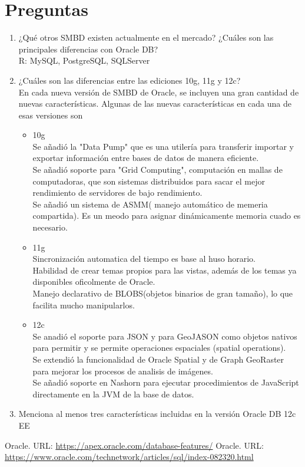 \documentclass[10pt]{article}
\begin{document}
	\section{Preguntas}
	\begin{enumerate}
		\item ¿Qué otros SMBD existen actualmente en el mercado? ¿Cuáles son las principales diferencias con Oracle DB?\\
		R: MySQL, PostgreSQL, SQLServer
        \item ¿Cuáles son las diferencias entre las ediciones 10g, 11g y 12c?\\
		En cada nueva versión de SMBD de Oracle, se incluyen una gran cantidad
		de nuevas características. Algunas de las nuevas características en 
		cada una de esas versiones son 
		\begin{itemize}
			\item {
				10g \\
				Se añadió la "Data Pump" que es una utilería para transferir
				importar y exportar información entre bases de datos de manera 
				eficiente. \\
				Se añadió soporte para "Grid Computing", computación en mallas
				de computadoras, que son sistemas distribuidos para sacar el 
				mejor rendimiento de servidores de bajo rendimiento. \\
				Se añadió un sistema de ASMM( manejo automático de memeria 
				compartida). Es un meodo para asignar dinámicamente memoria
				cuado es necesario.

			}
			\item {
				11g \\
				Sincronización automatica del tiempo es base al huso horario. \\
				Habilidad de crear temas propios para las vistas, además de los 
				temas ya disponibles oficolmente de Oracle. \\
				Manejo declarativo de BLOBS(objetos binarios de gran tamaño), lo que
				facilita mucho manipularlos.
			}
			\item {
				12c \\
				Se anadió el soporte para JSON  y para GeoJASON como objetos 
				nativos para permitir y se permite operaciones espaciales 
				(spatial operations).\\
				Se extendió la funcionalidad de Oracle Spatial y de Graph 
				GeoRaster para mejorar los procesos de analisis de imágenes. \\
				Se añadió soporte en Nashorn para ejecutar procedimientos de 
				JavaScript directamente en la JVM de la base de datos.
				}
		\end{itemize}
        \item Menciona al menos tres características incluidas en la versión Oracle DB 12c EE\\
	
	\end{enumerate}

\begin{thebibliography}{}
	\bibitem{}Oracle. URL: \url{https://apex.oracle.com/database-features/}
	\bibitem{}Oracle. URL: \url{https://www.oracle.com/technetwork/articles/sql/index-082320.html}
\end{thebibliography}

 
\end{document}
